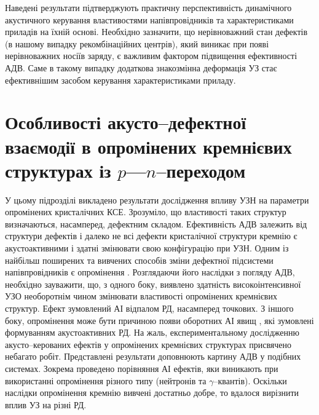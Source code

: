 Наведені результати підтверджують практичну перспективність динамічного акустичного керування властивостями напівпровідників та характеристиками приладів на їхній основі.
Необхідно зазначити, що нерівноважний стан дефектів (в нашому випадку рекомбінаційних центрів), який виникає при появі нерівноважних носіїв заряду,
є важливим фактором підвищення ефективності АДВ.
Саме в такому випадку додаткова знакозмінна деформація УЗ стає ефективнішим засобом керування характеристиками приладу.



\section{Особливості акусто--дефектної взаємодії в опромінених кремнієвих структурах із $p$---$n$--переходом\label{Rad_SSC}}
У цьому підрозділі викладено результати дослідження впливу УЗН на параметри опромінених кристалічних КСЕ.
Зрозуміло, що властивості таких структур визначаються, насамперед, дефектним складом.
Ефективність АДВ залежить від структури дефектів \cite{UST:Medvid} і
далеко не всі дефекти кристалічної структури кремнію є акустоактивними і здатні змінювати свою конфігурацію при УЗН.
Одним із найбільш поширених та вивчених способів зміни дефектної підсистеми напівпровідників є опромінення \cite{Kozlovs,DefImplan}.
Розглядаючи його наслідки з погляду АДВ, необхідно зауважити, що, з одного боку, виявлено \cite{YOlikh2007TPLr,Parchinskii2006r,Gorb2010,Podolian2012r} здатність високоінтенсивної УЗО необоротнім чином змінювати властивості опромінених кремнієвих структур.
Ефект зумовлений АІ відпалом РД, насамперед точкових.
З іншого боку, опромінення може бути причиною появи оборотних АІ явищ \cite{YOlikh2006TPLr,YOlikhTPL2011r},
які зумовлені формуванням акустоактивних РД.
На жаль, експериментальному  дослідженню акусто--керованих ефектів у опромінених кремнієвих структурах присвячено небагато робіт.
Представлені результати доповнюють картину АДВ у подібних системах.
Зокрема проведено порівняння АІ ефектів, яки виникають при використанні опромінення різного типу (нейтронів та $\gamma$--квантів).
Оскільки наслідки опромінення кремнію вивчені достатньо добре, то вдалося  вирізнити
вплив УЗ на різні РД.

